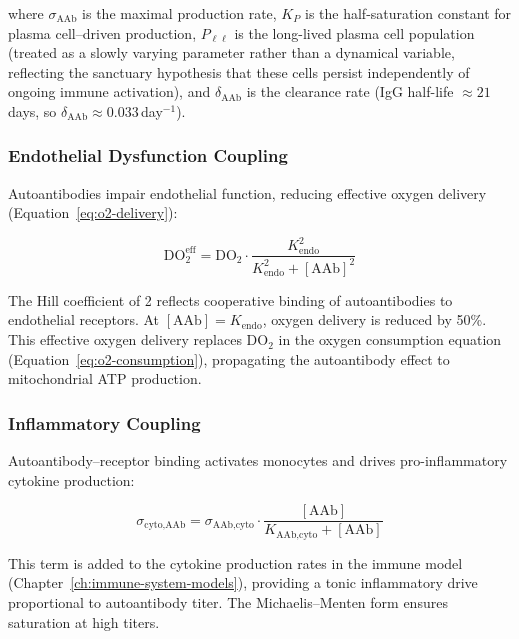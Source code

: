 where $\sigma_{\text{AAb}}$ is the maximal production rate, $K_P$ is the half-saturation constant for plasma cell--driven production, $P_{\ell\ell}$ is the long-lived plasma cell population (treated as a slowly varying parameter rather than a dynamical variable, reflecting the sanctuary hypothesis that these cells persist independently of ongoing immune activation), and $\delta_{\text{AAb}}$ is the clearance rate (IgG half-life $\approx 21$\,days, so $\delta_{\text{AAb}} \approx 0.033$\,day$^{-1}$).

\subsubsection{Endothelial Dysfunction Coupling}

Autoantibodies impair endothelial function, reducing effective oxygen delivery (Equation~\ref{eq:o2-delivery}):

\begin{equation}
\label{eq:aab-endothelial}
\text{DO}_{2}^{\text{eff}} = \text{DO}_2 \cdot \frac{K_{\text{endo}}^2}{K_{\text{endo}}^2 + [\text{AAb}]^2}
\end{equation}

The Hill coefficient of 2 reflects cooperative binding of autoantibodies to endothelial receptors. At $[\text{AAb}] = K_{\text{endo}}$, oxygen delivery is reduced by 50\%. This effective oxygen delivery replaces $\text{DO}_2$ in the oxygen consumption equation (Equation~\ref{eq:o2-consumption}), propagating the autoantibody effect to mitochondrial ATP production.

\subsubsection{Inflammatory Coupling}

Autoantibody--receptor binding activates monocytes and drives pro-inflammatory cytokine production:

\begin{equation}
\label{eq:aab-inflammation}
\sigma_{\text{cyto,AAb}} = \sigma_{\text{AAb,cyto}} \cdot \frac{[\text{AAb}]}{K_{\text{AAb,cyto}} + [\text{AAb}]}
\end{equation}

This term is added to the cytokine production rates in the immune model (Chapter~\ref{ch:immune-system-models}), providing a tonic inflammatory drive proportional to autoantibody titer. The Michaelis--Menten form ensures saturation at high titers.

